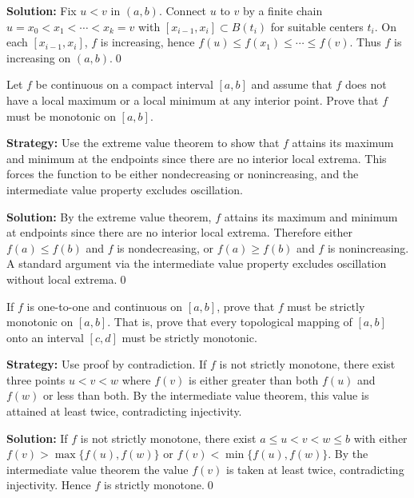 \bigskip\noindent\textbf{Solution:}
Fix $u<v$ in $(a,b)$. Connect $u$ to $v$ by a finite chain $u=x_0<x_1<\cdots<x_k=v$ with $[x_{i-1},x_i]\subset B(t_i)$ for suitable centers $t_i$. On each $[x_{i-1},x_i]$, $f$ is increasing, hence $f(u)\le f(x_1)\le\cdots\le f(v)$. Thus $f$ is increasing on $(a,b)$.\qed



\begin{problembox}
Let $f$ be continuous on a compact interval $[a, b]$ and assume that $f$ does not have a local maximum or a local minimum at any interior point. Prove that $f$ must be monotonic on $[a, b]$.
\end{problembox}

\noindent\textbf{Strategy:} Use the extreme value theorem to show that $f$ attains its maximum and minimum at the endpoints since there are no interior local extrema. This forces the function to be either nondecreasing or nonincreasing, and the intermediate value property excludes oscillation.

\bigskip\noindent\textbf{Solution:}
By the extreme value theorem, $f$ attains its maximum and minimum at endpoints since there are no interior local extrema. Therefore either $f(a)\le f(b)$ and $f$ is nondecreasing, or $f(a)\ge f(b)$ and $f$ is nonincreasing. A standard argument via the intermediate value property excludes oscillation without local extrema.\qed



\begin{problembox}
If $f$ is one-to-one and continuous on $[a, b]$, prove that $f$ must be strictly monotonic on $[a, b]$. That is, prove that every topological mapping of $[a, b]$ onto an interval $[c, d]$ must be strictly monotonic.
\end{problembox}

\noindent\textbf{Strategy:} Use proof by contradiction. If $f$ is not strictly monotone, there exist three points $u < v < w$ where $f(v)$ is either greater than both $f(u)$ and $f(w)$ or less than both. By the intermediate value theorem, this value is attained at least twice, contradicting injectivity.

\bigskip\noindent\textbf{Solution:}
If $f$ is not strictly monotone, there exist $a\le u<v<w\le b$ with either $f(v)>\max\{f(u),f(w)\}$ or $f(v)<\min\{f(u),f(w)\}$. By the intermediate value theorem the value $f(v)$ is taken at least twice, contradicting injectivity. Hence $f$ is strictly monotone.\qed



